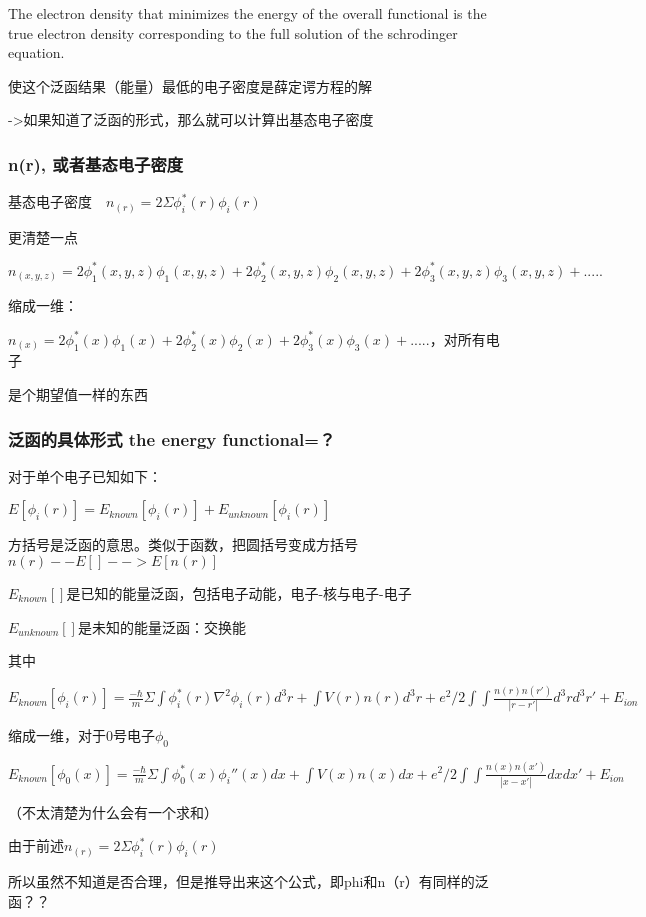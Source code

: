 \documentclass{article}
\begin{document}
The electron density that minimizes the energy of the overall functional is the true electron density corresponding to the full solution of the schrodinger equation.

使这个泛函结果（能量）最低的电子密度是薛定谔方程的解

->如果知道了泛函的形式，那么就可以计算出基态电子密度

\subsubsection {n(r), 或者基态电子密度}

基态电子密度　$n_{(r)} = 2\Sigma \phi_i^*(r)\phi_i(r)$

更清楚一点

$$n_{(x,y,z)} = 2\phi_1^*(x,y,z)\phi_1(x,y,z)+2\phi_2^*(x,y,z)\phi_2(x,y,z)+2\phi_3^*(x,y,z)\phi_3(x,y,z)+.....$$

缩成一维：

$n_{(x)} = 2\phi_1^*(x)\phi_1(x)+2\phi_2^*(x)\phi_2(x)+2\phi_3^*(x)\phi_3(x)+.....$，对所有电子

是个期望值一样的东西

\subsubsection {泛函的具体形式 the energy functional=？}

对于单个电子已知如下：

$E[\phi_i(r)]=E_{known}[\phi_i(r)]+E_{unknown}[\phi_i(r)]$

方括号是泛函的意思。类似于函数，把圆括号变成方括号
$ n(r) -- E[] --> E[n(r)] $


$E_{known}[]$是已知的能量泛函，包括电子动能，电子-核与电子-电子

$E_{unknown}[]$是未知的能量泛函：交换能


其中

$E_{known}[\phi_i(r)]=\frac{-\hbar}{m}\Sigma\int\phi_i^*(r)\nabla^2\phi_i(r)d^3r+\int V(r)n(r)d^3r+e^2/2\int \int \frac {n(r)n(r')}{|r-r'|}d^3rd^3r'+E_{ion} $

缩成一维，对于0号电子$\phi_0$

$E_{known}[\phi_0(x)]=\frac{-\hbar}{m}\Sigma\int\phi_0^*(x)\phi_i''(x)dx+\int V(x)n(x)dx+e^2/2\int \int \frac {n(x)n(x')}{|x-x'|}dxdx'+E_{ion} $

（不太清楚为什么会有一个求和）

由于前述$n_{(r)} = 2\Sigma \phi_i^*(r)\phi_i(r)$

所以虽然不知道是否合理，但是推导出来这个公式，即phi和n（r）有同样的泛函？？
\end{document}
